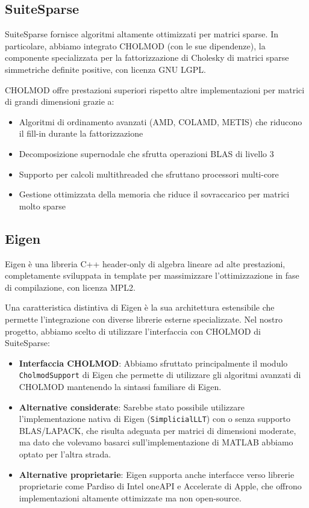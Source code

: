 \subsection{SuiteSparse}
SuiteSparse fornisce algoritmi altamente ottimizzati per matrici sparse. In particolare, abbiamo integrato CHOLMOD (con le sue dipendenze), 
la componente specializzata per la fattorizzazione di Cholesky di matrici sparse simmetriche definite positive, con licenza GNU LGPL.

CHOLMOD offre prestazioni superiori rispetto altre implementazioni per matrici di grandi dimensioni grazie a:

\begin{itemize}
    \item Algoritmi di ordinamento avanzati (AMD, COLAMD, METIS) che riducono il fill-in durante la fattorizzazione
    \item Decomposizione supernodale che sfrutta operazioni BLAS di livello 3
    \item Supporto per calcoli multithreaded che sfruttano processori multi-core
    \item Gestione ottimizzata della memoria che riduce il sovraccarico per matrici molto sparse
\end{itemize}

\subsection{Eigen}
Eigen è una libreria C++ header-only di algebra lineare ad alte prestazioni, completamente sviluppata in template 
per massimizzare l'ottimizzazione in fase di compilazione, con licenza MPL2.

Una caratteristica distintiva di Eigen è la sua architettura estensibile che permette 
l'integrazione con diverse librerie esterne specializzate. Nel nostro progetto, 
abbiamo scelto di utilizzare l'interfaccia con CHOLMOD di SuiteSparse:

\begin{itemize}
    \item \textbf{Interfaccia CHOLMOD}: Abbiamo sfruttato principalmente il modulo \texttt{CholmodSupport} di Eigen che 
    permette di utilizzare gli algoritmi avanzati di CHOLMOD mantenendo la sintassi familiare di Eigen. 
    
    \item \textbf{Alternative considerate}: Sarebbe stato possibile utilizzare l'implementazione nativa di Eigen 
    (\texttt{SimplicialLLT}) con o senza supporto BLAS/LAPACK, che risulta adeguata per matrici di dimensioni moderate, 
    ma dato che volevamo basarci sull'implementazione di MATLAB abbiamo optato per l'altra strada.
    
    \item \textbf{Alternative proprietarie}: Eigen supporta anche interfacce verso librerie proprietarie come Pardiso di Intel oneAPI e 
    Accelerate di Apple, che offrono implementazioni altamente ottimizzate ma non open-source.
\end{itemize}


